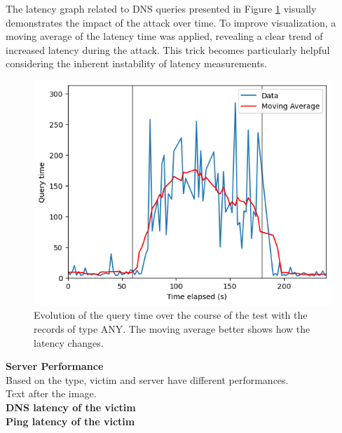 The latency graph related to DNS queries presented in Figure \ref{fig:Query_MA_ANY1} visually demonstrates the impact of the attack over time. To improve visualization, a moving average of the latency time was applied, revealing a clear trend of increased latency during the attack. This trick becomes particularly helpful considering the inherent instability of latency measurements.
\begin{figure}[H]
    \centering
    \includegraphics[width=\columnwidth]{Sections/Images/Query_MA_ANY.png}
    \caption{Evolution of the query time over the course of the test with the records of type ANY. The moving average better shows how the latency changes.}
    \label{fig:Query_MA_ANY1}
\end{figure}

\noindent \textbf{Server Performance}\\
Based on the type, victim and server have different performances.\\
\noindent Text after the image.\\
{\bfseries DNS latency of the victim}\\
{\bfseries Ping latency of the victim}\\